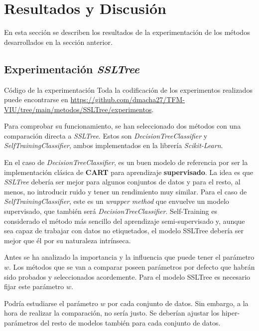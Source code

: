 
\newpage
\chapter{Resultados y Discusión}
\label{resultados-y-discusion}

En esta sección se describen los resultados de la experimentación de los métodos desarrollados en la sección anterior.

\section{Experimentación \textit{SSLTree}}
\label{metodologia-experimentacion}

\begin{mainbox}{Código de la experimentación}
    Toda la codificación de los experimentos realizados puede encontrarse en \url{https://github.com/dmacha27/TFM-VIU/tree/main/metodos/SSLTree/experimentos}.
\end{mainbox}

Para comprobar su funcionamiento, se han seleccionado dos métodos con una comparación directa a \textit{SSLTree}. Estos son \textit{DecisionTreeClassifier} y \textit{SelfTrainingClassifier}, ambos implementados en la librería \textit{Scikit-Learn}.

En el caso de \textit{DecisionTreeClassifier}, es un buen modelo de referencia por ser la implementación clásica de \textbf{CART} para aprendizaje \textbf{supervisado}. La idea es que \textit{SSLTree} debería ser mejor para algunos conjuntos de datos y para el resto, al menos, no introducir ruido y tener un rendimiento muy similar.
Para el caso de \textit{SelfTrainingClassifier}, este es un \textit{wrapper method} que envuelve un modelo supervisado, que también será \textit{DecisionTreeClassifier}. Self-Training es considerado el método más sencillo del aprendizaje semi-supervisado y, aunque sea capaz de trabajar con datos no etiquetados, el modelo SSLTree debería ser mejor que él por su naturaleza intrínseca.

Antes se ha analizado la importancia y la influencia que puede tener el parámetro $w$. Los métodos que se van a comparar poseen parámetros por defecto que habrán sido probados y seleccionados acordemente. Para el modelo SSLTree es necesario fijar este parámetro $w$.

Podría estudiarse el parámetro $w$ por cada conjunto de datos. Sin embargo, a la hora de realizar la comparación, no sería justo. Se deberían ajustar los hiper-parámetros del resto de modelos también para cada conjunto de datos.

